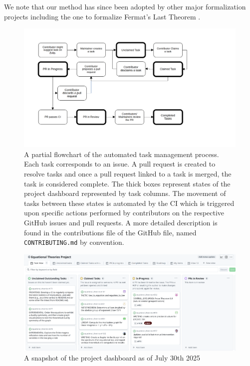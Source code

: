 We note that our method has since been adopted by other major formalization projects including the one to formalize Fermat's Last Theorem \cite{FLT_Lean}.
\begin{figure}[t]
    \centering
    \includegraphics[width=1.0\textwidth]{proj_mgmt_figures/task_flowchart.png}
    \caption{\label{fig:proj_mgmt_flow} A partial flowchart of the automated task management process. Each task corresponds to an issue. A pull request is created to resolve tasks and once a pull request linked to a task is merged, the task is considered complete. The thick boxes represent states of the project dashboard represented by task columns. The movement of tasks between these states is automated by the CI which is triggered upon specific actions performed by contributors on the respective GitHub issues and pull requests. A more detailed description is found in the contributions file of the GitHub file, named \texttt{CONTRIBUTING.md} by convention.}
\end{figure}

\begin{figure}[t]
    \centering
    \includegraphics[width=1.0\textwidth]{proj_mgmt_figures/proj_dash_snapshot.png}
    \caption{\label{fig:proj_dashboard} A snapshot of the project dashboard as of July 30th 2025}
\end{figure}
